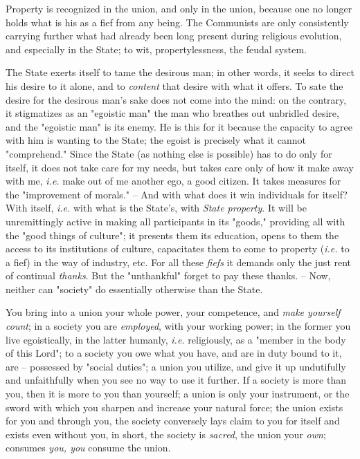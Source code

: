 Property is recognized in the union, and only in the union, because one no 
longer holds what is his as a fief from any being. The Communists are only 
consistently carrying further what had already been long present during 
religious evolution, and especially in the State; to wit, propertylessness, 
the feudal system.

The State exerts itself to tame the desirous man; in other words, it seeks to 
direct his desire to it alone, and to \textit{content} that desire with what 
it offers. To sate the desire for the desirous man's sake does not come into 
the mind: on the contrary, it stigmatizes as an "{}egoistic man"{} the man who 
breathes out unbridled desire, and the "{}egoistic man"{} is its enemy. He is 
this for it because the capacity to agree with him is wanting to the State; 
the egoist is precisely what it cannot "{}comprehend."{} Since the State (as 
nothing else is possible) has to do only for itself, it does not take care for 
my needs, but takes care only of how it make away with me, \textit{i.e.} make 
out of me another ego, a good citizen. It takes measures for the 
"{}improvement of morals."{} -- And with what does it win individuals for 
itself? With itself, \textit{i.e.} with what is the State's, with 
\textit{State property}. It will be unremittingly active in making all 
participants in its "{}goods,"{} providing all with the "{}good things of 
culture"{}; it presents them its education, opens to them the access to its 
institutions of culture, capacitates them to come to property (\textit{i.e.} 
to a fief) in the way of industry, etc. For all these \textit{fiefs} it 
demands only the just rent of continual \textit{thanks}. But the 
"{}unthankful"{} forget to pay these thanks. -- Now, neither can "{}society"{} 
do essentially otherwise than the State.

You bring into a union your whole power, your competence, and \textit{make 
yourself count}; in a society you are \textit{employed}, with your working 
power; in the former you live egoistically, in the latter humanly, 
\textit{i.e.} religiously, as a "{}member in the body of this Lord"{}; to a 
society you owe what you have, and are in duty bound to it, are -- possessed 
by "{}social duties"{}; a union you utilize, and give it up undutifully and 
unfaithfully when you see no way to use it further. If a society is more than 
you, then it is more to you than yourself; a union is only your instrument, or 
the sword with which you sharpen and increase your natural force; the union 
exists for you and through you, the society conversely lays claim to you for 
itself and exists even without you, in short, the society is \textit{sacred}, 
the union your \textit{own}; consumes \textit{you, you} consume the union.

